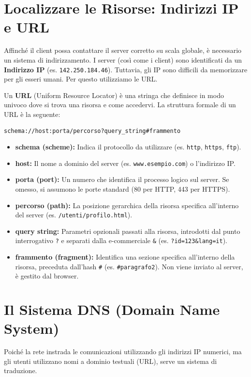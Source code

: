 \documentclass[11pt,a4paper]{report}
\begin{document}
\section{Localizzare le Risorse: Indirizzi IP e URL}
Affinché il client possa contattare il server corretto su scala globale, è necessario un sistema di indirizzamento. I server (così come i client) sono identificati da un \textbf{Indirizzo IP} (es. \texttt{142.250.184.46}). Tuttavia, gli IP sono difficili da memorizzare per gli esseri umani. Per questo utilizziamo le URL.

Un \textbf{URL} (Uniform Resource Locator) è una stringa che definisce in modo univoco dove si trova una risorsa e come accedervi. La struttura formale di un URL è la seguente:

\begin{lstlisting}
schema://host:porta/percorso?query_string#frammento
\end{lstlisting}

\begin{itemize}
    \item \textbf{schema (scheme):} Indica il protocollo da utilizzare (es. \texttt{http}, \texttt{https}, \texttt{ftp}).
    \item \textbf{host:} Il nome a dominio del server (es. \texttt{www.esempio.com}) o l'indirizzo IP.
    \item \textbf{porta (port):} Un numero che identifica il processo logico sul server. Se omesso, si assumono le porte standard (80 per HTTP, 443 per HTTPS).
    \item \textbf{percorso (path):} La posizione gerarchica della risorsa specifica all'interno del server (es. \texttt{/utenti/profilo.html}).
    \item \textbf{query string:} Parametri opzionali passati alla risorsa, introdotti dal punto interrogativo \texttt{?} e separati dalla e-commerciale \texttt{\&} (es. \texttt{?id=123\&lang=it}).
    \item \textbf{frammento (fragment):} Identifica una sezione specifica all'interno della risorsa, preceduta dall'hash \texttt{\#} (es. \texttt{\#paragrafo2}). Non viene inviato al server, è gestito dal browser.
\end{itemize}

\section{Il Sistema DNS (Domain Name System)}
Poiché la rete instrada le comunicazioni utilizzando gli indirizzi IP numerici, ma gli utenti utilizzano nomi a dominio testuali (URL), serve un sistema di traduzione. 
\end{document}
